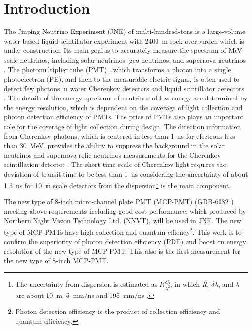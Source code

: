 \section{Introduction}
The Jinping Neutrino Experiment (JNE) of multi-hundred-tons is a large-volume water-based liquid scintillator experiment with \SI{2400}{m} rock overburden \cite{LetterJNE2017} which is under construction. Its main goal is to accurately measure the spectrum of MeV-scale neutrinos, including solar neutrinos, geo-neutrinos, and supernova neutrinos \cite{LetterJNE2017}. %
The photomultiplier tube (PMT) \cite{HAMAMATSUManual}, which transforms a photon into a single photoelectron (PE), and then to the measurable electric signal, is often used to detect few photons in water Cherenkov detectors \cite{SNO,SuperK} and liquid scintillator detectors \cite{KamLAND,JUNO:2015zny}. The details of the energy spectrum of neutrinos of low energy are determined by the energy resolution, which is dependent on the coverage of light collection and photon detection efficiency of PMTs. The price of PMTs also plays an important role for the coverage of light collection during design. The direction information from Cherenkov photons, which is centered in less than \SI{1}{ns} for electrons less than \SI{30}{MeV}, provides the ability to suppress the background in the solar neutrinos and supernova relic neutrinos measurements for the Cherenkov scintillation detector \cite{Guo_2019}. The short time scale of Cherenkov light requires the deviation of transit time to be less than \SI{1}{ns} considering the uncertainty of about \SI{1.3}{ns} for \SI{10}{m} scale detectors from the dispersion\footnote{The uncertainty from dispersion is estimated as $R\frac{\delta\lambda}{\lambda^2}$, in which $R$, $\delta\lambda$, and $\lambda$ are about \SI{10}{m}, \SI{5}{mm/ns} and \SI{195}{mm/ns} \cite{Luo:2022xrd}.} is the main component.

The new type of 8-inch micro-channel plate PMT (MCP-PMT) (GDB-6082 \cite{GDB-6082}) meeting above requirements including good cost performance, which produced by Northern Night Vision Technology Ltd. (NNVT), will be used in JNE. The new type of MCP-PMTs have high collection and quantum effiency\footnote{Photon detection efficiency is the product of collection efficiency and quantum efficiency.}. This work is to confirm the superiority of photon detection efficiency (PDE) and boost on energy resolution of the new type of MCP-PMT. This also is the first measurement for the new type of 8-inch MCP-PMT.

